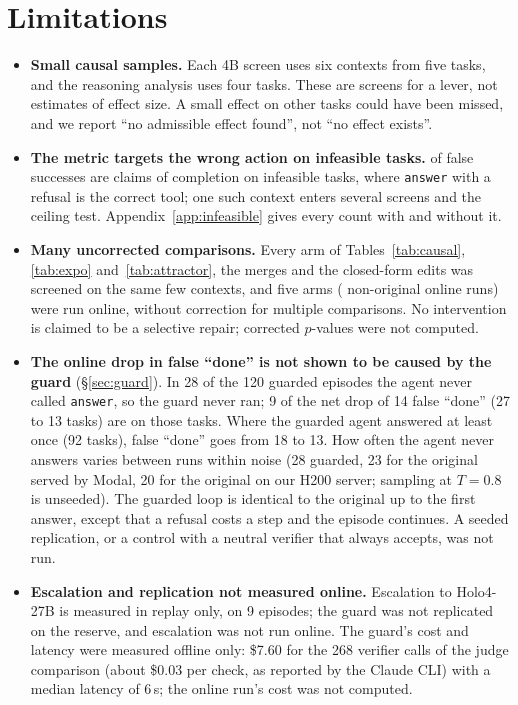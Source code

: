 \section{Limitations}
\label{sec:limits}
\begin{itemize}
\item \textbf{Small causal samples.} Each 4B screen uses six contexts from five tasks, and the reasoning analysis uses four tasks. These are screens for a lever, not estimates of effect size. A small effect on other tasks could have been missed, and we report ``no admissible effect found'', not ``no effect exists''.
\item \textbf{The metric targets the wrong action on infeasible tasks.} \oswFsInfeasible{} of \oswCatFalseSuccess{} false successes are claims of completion on infeasible tasks, where \texttt{answer} with a refusal is the correct tool; one such context enters several screens and the ceiling test. Appendix~\ref{app:infeasible} gives every count with and without it.
\item \textbf{Many uncorrected comparisons.} Every arm of Tables~\ref{tab:causal}, \ref{tab:expo} and~\ref{tab:attractor}, the merges and the closed-form edits was screened on the same few contexts, and five arms (\onNArms{} non-original online runs) were run online, without correction for multiple comparisons. No intervention is claimed to be a selective repair; corrected $p$-values were not computed.
\item \textbf{The online drop in false ``done'' is not shown to be caused by the guard} (\S\ref{sec:guard}). In 28 of the 120 guarded episodes the agent never called \texttt{answer}, so the guard never ran; 9 of the net drop of 14 false ``done'' (27 to 13 tasks) are on those tasks. Where the guarded agent answered at least once (92 tasks), false ``done'' goes from 18 to 13. How often the agent never answers varies between runs within noise (28 guarded, 23 for the original served by Modal, 20 for the original on our H200 server; sampling at $T=0.8$ is unseeded). The guarded loop is identical to the original up to the first answer, except that a refusal costs a step and the episode continues. A seeded replication, or a control with a neutral verifier that always accepts, was not run. %
\item \textbf{Escalation and replication not measured online.} Escalation to Holo4-27B is measured in replay only, on 9 episodes; the guard was not replicated on the reserve, and escalation was not run online. The guard's cost and latency were measured offline only: \$7.60 for the 268 verifier calls of the judge comparison (about \$0.03 per check, as reported by the Claude CLI) with a median latency of 6\,s; the online run's cost was not computed. %

\end{itemize}
